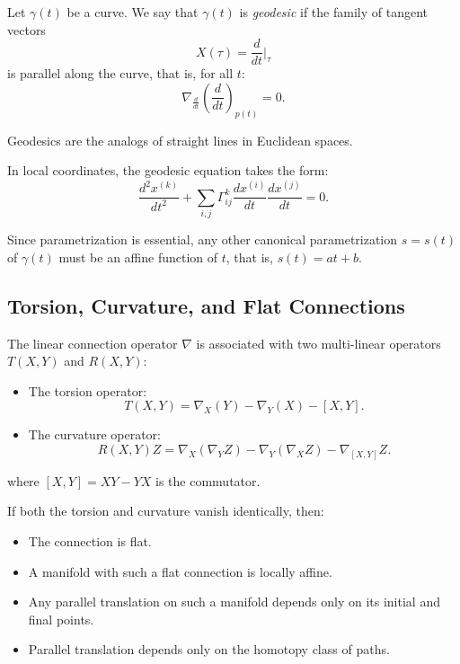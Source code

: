 \begin{definition}
    Let $\gamma(t)$ be a curve. We say that $\gamma(t)$ is \textit{geodesic} if the family of tangent vectors 
    \[
    X(\tau) = \frac{d}{dt} \Big|_{\tau}
    \]
    is parallel along the curve, that is, for all $t$:
    \[
    \nabla_{\frac{d}{dt}} \left(\frac{d}{dt}\right)_{p(t)} = 0.
    \]
\end{definition}

\begin{remark}
    Geodesics are the analogs of straight lines in Euclidean spaces.
\end{remark}

In local coordinates, the geodesic equation takes the form:
\[
\frac{d^2 x^{(k)}}{dt^2} + \sum_{i,j} \Gamma_{ij}^k \frac{dx^{(i)}}{dt} \frac{dx^{(j)}}{dt} =0.
\]

Since parametrization is essential, any other canonical parametrization $s = s(t)$ of $\gamma(t)$ must be an affine function of $t$, that is, $s(t) = at + b$.

\subsection{Torsion, Curvature, and Flat Connections}

The linear connection operator $\nabla$ is associated with two multi-linear operators $T(X,Y)$ and $R(X,Y)$:
\begin{itemize}
    \item The torsion operator:
    \[
    T(X,Y) = \nabla_{X}(Y) - \nabla_{Y}(X) - [X,Y].
    \]
    \item The curvature operator:
    \[
    R(X,Y)Z = \nabla_{X}(\nabla_{Y}Z) - \nabla_Y(\nabla_{X}Z) - \nabla_{[X,Y]}Z.
    \]
\end{itemize}
where $[X,Y] = XY - YX$ is the commutator.

\begin{remark}
    If both the torsion and curvature vanish identically, then:
    \begin{itemize}
        \item The connection is flat.
        \item A manifold with such a flat connection is locally affine.
        \item Any parallel translation on such a manifold depends only on its initial and final points.
        \item Parallel translation depends only on the homotopy class of paths.
    \end{itemize}
\end{remark}


